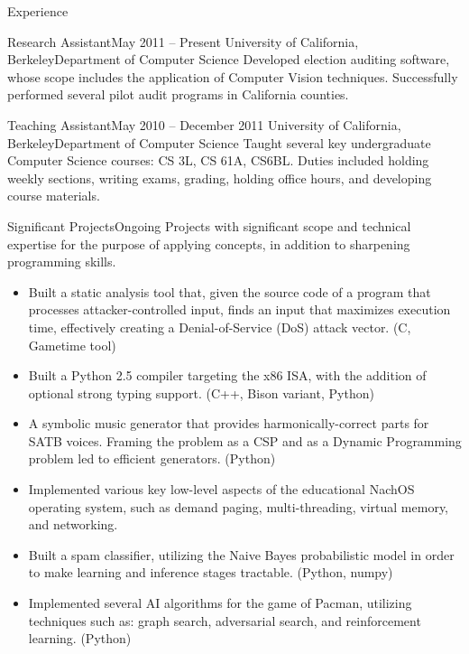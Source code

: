\documentclass{resume}
\begin{document}
\begin{component}{Experience}
	\begin{position}{Research Assistant}{May 2011 -- Present}
	 	{University of California, Berkeley}{Department of Computer Science}
	{Developed election auditing software, whose scope includes the 
         application of Computer Vision techniques. Successfully performed
         several pilot audit programs in California counties.}
	\end{position}

	\begin{position}{Teaching Assistant}{May 2010 -- December 2011}
		{University of California, Berkeley}{Department of Computer Science}
	{Taught several key undergraduate Computer Science courses: CS 3L, CS 61A, CS6BL. 
	 Duties included holding weekly sections, writing exams, grading, 
	holding office hours, and developing course materials.}
	\end{position}

	\begin{position}{Significant Projects}{Ongoing}
		{}{\vspace{-1.0em}}
	{Projects with significant scope and technical expertise for the purpose of applying concepts, in addition to
	sharpening programming skills.}

	\begin{itemize}
		\vspace{-0.5em}\item Built a static analysis tool that, given the source code of a program that
		processes attacker-controlled input, finds an input that maximizes execution time, effectively
		creating a Denial-of-Service (DoS) attack vector. (C, Gametime tool)
		\vspace{-0.5em}\item Built a Python 2.5 compiler targeting the x86 ISA, with the addition of
		optional strong typing support. (C++, Bison variant, Python)
		\vspace{-0.5em}\item A symbolic music generator that provides harmonically-correct
		parts for SATB voices. Framing the problem as a CSP and as a Dynamic Programming problem led to efficient generators.
		(Python)
		\vspace{-0.5em}\item Implemented various key low-level aspects of the 
		educational NachOS operating system, such as demand paging, multi-threading, virtual memory, and 
		networking.
		\vspace{-0.5em}\item Built a spam classifier, utilizing the Naive Bayes probabilistic model in order to make
		learning and inference stages tractable. (Python, numpy)
		\vspace{-0.5em}\item Implemented several AI algorithms for the game of Pacman, utilizing
		techniques such as: graph search, adversarial search, and reinforcement learning. (Python)
	\end{itemize}
	\end{position}
\end{component}
\end{document}

